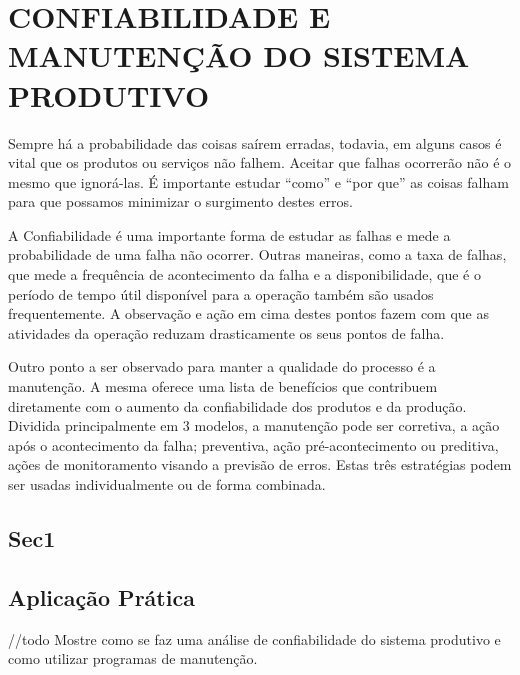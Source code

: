 \chapter{CONFIABILIDADE E MANUTENÇÃO DO SISTEMA PRODUTIVO}
\label{chap:confiabilidade_manutencao_do_sistema_produtivo}
Sempre há a probabilidade das coisas saírem erradas, todavia, em alguns casos é vital que os produtos ou serviços não falhem. Aceitar que falhas ocorrerão não é o mesmo que ignorá-las. É importante estudar ``como'' e ``por que'' as coisas falham para que possamos minimizar o surgimento destes erros.

A Confiabilidade é uma importante forma de estudar as falhas e mede a probabilidade de uma falha não ocorrer. Outras maneiras, como a taxa de falhas, que mede a frequência de acontecimento da falha e a disponibilidade, que é o período de tempo útil disponível para a operação também são usados frequentemente. A observação e ação em cima destes pontos fazem com que as atividades da operação reduzam drasticamente os seus pontos de falha.

Outro ponto a ser observado para manter a qualidade do processo é a manutenção. A mesma oferece uma lista de benefícios que contribuem diretamente com o aumento da confiabilidade dos produtos e da produção. Dividida principalmente em 3 modelos, a manutenção pode ser corretiva, a ação após o acontecimento da falha; preventiva, ação pré-acontecimento ou preditiva, ações de monitoramento visando a previsão de erros. Estas três estratégias podem ser usadas individualmente ou de forma combinada.

\section{Sec1}
\label{sec:confiabilidade_manutencao_sec1}




\section{Aplicação Prática}
\label{sec:confiabilidade_manutencao_aplicacao}
//todo Mostre como se faz uma análise de confiabilidade do sistema produtivo e como utilizar programas de manutenção.




